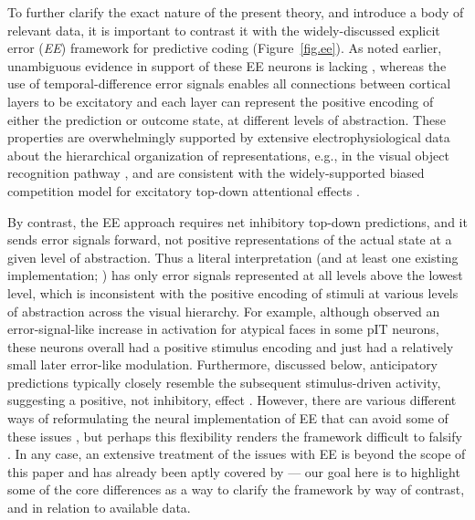 \documentclass[11pt,twoside]{article}
\newif\myifpdf
\begin{document}
To further clarify the exact nature of the present theory, and introduce a body of relevant data, it is important to contrast it with the widely-discussed explicit error (\emph{EE}) framework for predictive coding \citep{RaoBallard99,Friston10,BastosUsreyAdamsEtAl12,LotterKreimanCox16} (Figure~\ref{fig.ee}).  As noted earlier, unambiguous evidence in support of these EE neurons is lacking \citep{WalshMcGovernClarkEtAl20}, whereas the use of temporal-difference error signals enables all connections between cortical layers to be excitatory and each layer can represent the positive encoding of either the prediction or outcome state, at different levels of abstraction.  
These properties are overwhelmingly supported by extensive electrophysiological data about the hierarchical organization of representations, e.g., in the visual object recognition pathway \citep{KobatakeTanaka94,VanRullenThorpe02,CadieuHongYaminsEtAl14}, and are consistent with the widely-supported biased competition model for excitatory top-down attentional effects \citep{DesimoneDuncan95,ReynoldsChelazziDesimone99,MillerCohen01,OReillyWyatteHerdEtAl13}.

By contrast, the EE approach requires net inhibitory top-down predictions, and it sends error signals forward, not positive representations of the actual state at a given level of abstraction.  Thus a literal interpretation (and at least one existing implementation; \citealp{LotterKreimanCox16}) 
has only error signals represented at all levels above the lowest level, which is inconsistent with the positive encoding of stimuli at various levels of abstraction across the visual hierarchy.  For example, although \citet{IssaCadieuDiCarlo18} observed an error-signal-like increase in activation for atypical faces in some pIT neurons, these neurons overall had a positive stimulus encoding and just had a relatively small later error-like modulation.  Furthermore, discussed below, anticipatory predictions typically closely resemble the subsequent stimulus-driven activity, suggesting a positive, not inhibitory, effect  \citep{DuhamelColbyGoldberg92,LeeMumford03,CavanaghHuntAfrazEtAl10,WalshMcGovernClarkEtAl20}.  However, there are various different ways of reformulating the neural implementation of EE that can avoid some of these issues \citep{Spratling08,BastosUsreyAdamsEtAl12}, but perhaps this flexibility renders the framework difficult to falsify \citep{KogoTrengove15}.  In any case, an extensive treatment of the issues with EE is beyond the scope of this paper and has already been aptly covered by \citet{WalshMcGovernClarkEtAl20} --- our goal here is to highlight some of the core differences as a way to clarify the framework by way of contrast, and in relation to available data.
\end{document}
